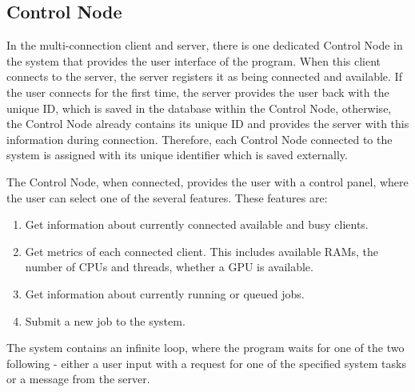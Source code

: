 \documentclass[10pt]{report}
\begin{document}
\subsection{Control Node} \label{controlnode}

In the multi-connection client and server, there is one dedicated Control Node in the system that provides the user interface of the program. When this client connects to the server, the server registers it as being connected and available. If the user connects for the first time, the server provides the user back with the unique ID, which is saved in the database within the Control Node, otherwise, the Control Node already contains its unique ID and provides the server with this information during connection. Therefore, each Control Node connected to the system is assigned with its unique identifier which is saved externally.
\newline

The Control Node, when connected, provides the user with a control panel, where the user can select one of the several features. These features are:
\begin{enumerate}
    \item Get information about currently connected available and busy clients.
    \item Get metrics of each connected client. This includes available RAMs, the number of CPUs and threads, whether a GPU is available.
    \item Get information about currently running or queued jobs.
    \item Submit a new job to the system.
\end{enumerate}

The system contains an infinite loop, where the program waits for one of the two following - either a user input with a request for one of the specified system tasks or a message from the server.
\end{document}
